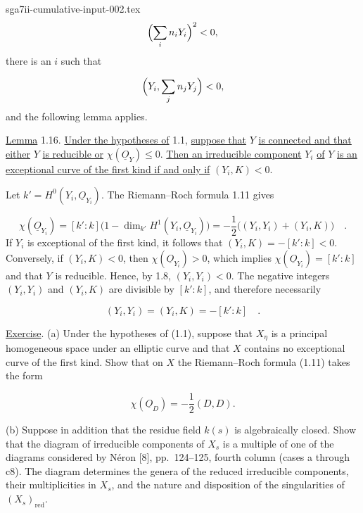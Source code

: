 \begin{filecontents*}{sga7ii-cumulative-input-002.tex}
\begin{equation*}
\Bigl(\sum_i n_iY_i\Bigr)^2<0,
\end{equation*}
there is an $i$ such that

\begin{equation*}
\Bigl(Y_i,\sum_j n_jY_j\Bigr)<0,
\end{equation*}
and the following lemma applies.

\underline{Lemma} 1.16. \underline{Under the hypotheses of} 1.1,
\underline{suppose that} $Y$ \underline{is connected and that either} $Y$
\underline{is reducible or} $\chi(\underline{O}_Y)\leq0$.
\underline{Then an irreducible component} $Y_i$ \underline{of} $Y$
\underline{is an exceptional curve of the first kind if and only if}
$(Y_i,K)<0$.

Let $k'=H^0(Y_i,\underline{O}_{Y_i})$.  The Riemann--Roch formula 1.11 gives

\begin{equation*}
\chi(\underline{O}_{Y_i})
=[k':k]\bigl(1-\dim_{k'}H^1(Y_i,\underline{O}_{Y_i})\bigr)
=-\frac12\bigl((Y_i,Y_i)+(Y_i,K)\bigr) \quad .
\end{equation*}
If $Y_i$ is exceptional of the first kind, it follows that
$(Y_i,K)=-[k':k]<0$.  Conversely, if $(Y_i,K)<0$, then
$\chi(\underline{O}_{Y_i})>0$, which implies
$\chi(\underline{O}_{Y_i})=[k':k]$ and that $Y$ is reducible.  Hence, by 1.8,
$(Y_i,Y_i)<0$.  The negative integers $(Y_i,Y_i)$ and $(Y_i,K)$ are divisible by
$[k':k]$, and therefore necessarily

\begin{equation*}
(Y_i,Y_i)=(Y_i,K)=-[k':k] \quad .
\end{equation*}

\underline{Exercise}. (a) Under the hypotheses of (1.1), suppose that $X_\eta$ is
a principal homogeneous space under an elliptic curve and that $X$ contains no
exceptional curve of the first kind.  Show that on $X$ the Riemann--Roch formula
(1.11) takes the form

\begin{equation*}
\chi(\underline{O}_D)=-\frac12(D,D).
\end{equation*}


(b) Suppose in addition that the residue field $k(s)$ is algebraically closed.
Show that the diagram of irreducible components of $X_s$ is a multiple of one of
the diagrams considered by Néron [8], pp.~124--125, fourth column (cases a through
c8).  The diagram determines the genera of the reduced irreducible components,
their multiplicities in $X_s$, and the nature and disposition of the singularities
of $(X_s)_{\mathrm{red}}$.


\end{filecontents*}
